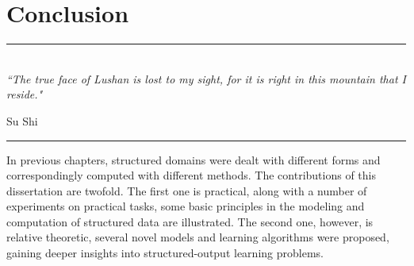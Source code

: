
\chapter{Conclusion} %

\label{Chapter6} %


\rule{\textwidth}{0.4pt} \\[0.5cm]
\textit{``The true face of Lushan is lost to my sight, for it is right in this mountain that I reside."}

\begin{flushright}
Su Shi
\end{flushright}
\rule{\textwidth}{0.4pt} 

In previous chapters, structured domains were dealt with different forms and correspondingly computed with different methods.   
The contributions of this dissertation are twofold. The first one is practical, along with a number of experiments on practical tasks, some basic 
principles in the modeling and computation of structured data are illustrated. The second one, however, is relative theoretic, several        
novel models and learning algorithms were proposed, gaining deeper insights into structured-output learning problems.           

